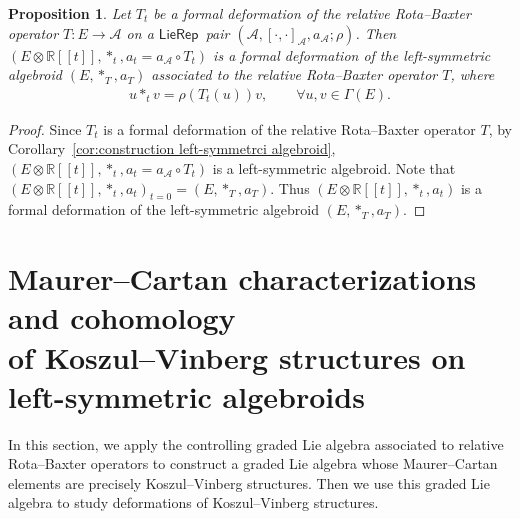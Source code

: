 \documentclass[pdftex]{sigma}%
\numberwithin{equation}{section}
\newtheorem{pro}[thm]{Proposition}
\newcommand{\Real}{\mathbb R}
\newcommand{\huaA}{\mathcal{A}}
\newcommand{\LP}{$\mathsf{LieRep}$~}
\begin{document}
\begin{pro}
 Let $T_t$ be a formal deformation of the relative Rota--Baxter operator $T\colon E\allowbreak\longrightarrow \huaA$ on a \LP pair $(\huaA,[\cdot,\cdot]_\huaA,a_\huaA;\rho)$. Then $(E\otimes \Real[[t]],\ast_t,a_t=a_\huaA\circ T_t)$ is a formal deformation of the left-symmetric algebroid $(E, \ast_{T}, a_T)$ associated to the relative Rota--Baxter operator $T$, where
\begin{gather*}
u\ast_t v=\rho(T_t(u))v,\qquad\forall u,v\in\Gamma(E).
\end{gather*}
\end{pro}
\begin{proof}
Since $T_t$ is a formal deformation of the relative Rota--Baxter operator $T$, by Corollary~\ref{cor:construction left-symmetrci algebroid}, $(E\otimes \Real[[t]],\ast_t,a_t=a_\huaA\circ T_t)$ is a left-symmetric algebroid. Note that $(E\otimes \Real[[t]],\ast_t,a_t)_{t=0}\allowbreak=(E, \ast_{T}, a_T)$. Thus $(E\otimes \Real[[t]],\ast_t,a_t)$ is a formal deformation of the left-symmetric algebroid $(E, \ast_{T}, a_T)$.
\end{proof}

\section[Maurer--Cartan characterizations and cohomology of Koszul--Vinberg structures on left-symmetric algebroids]
{Maurer--Cartan characterizations and cohomology \\of Koszul--Vinberg structures on left-symmetric algebroids}\label{sec:Cohomology-KV-structure}
In this section, we apply the controlling graded Lie algebra associated to relative Rota--Baxter operators to construct a graded Lie algebra whose Maurer--Cartan elements are precisely Koszul--Vinberg structures. Then we use this graded Lie algebra to study deformations of Koszul--Vinberg structures.
\end{document}
